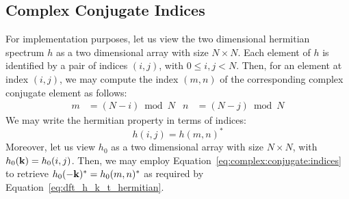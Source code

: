 \subsection{Complex Conjugate Indices}
%
For implementation purposes, let us view the two dimensional hermitian spectrum $h$
as a two dimensional array with size $N \times N$.
Each element of $h$ is identified by a pair of indices $(i,j)$, with $0\leq i,j <N$. Then, for
an element at index $(i,j)$, we may compute the index $(m,n)$ of the corresponding complex
conjugate element as follows:
\begin{align}
\label{eq:complex:conjugate:indices}
m &= (N - i)\bmod N & n &= (N - j)\bmod N
\end{align}
We may write the hermitian property in terms of indices:
\begin{equation*}
 h(i,j) = h(m,n)^*
\end{equation*}
%
Moreover, let us view $h_0$ as a two dimensional array with size $N \times N$,
with $h_0(\mathbf{k}) = h_0(i,j)$. Then, we may employ Equation~\ref{eq:complex:conjugate:indices}
to retrieve $h_0(-\mathbf{k})^*=h_0(m,n)^*$ as required by
Equation~\ref{eq:dft_h_k_t_hermitian}.
%
